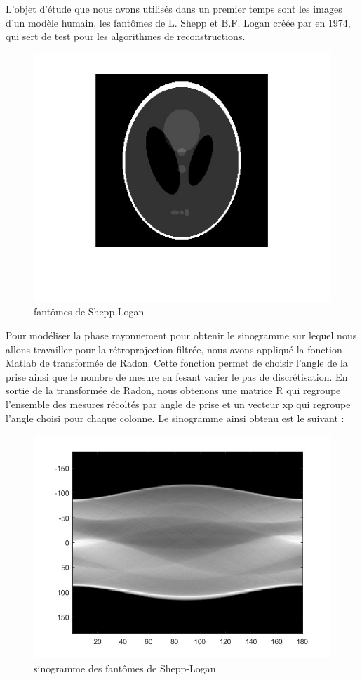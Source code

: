 \documentclass[conference]{IEEEtran}
\begin{document}
L'objet d'étude que nous avons utilisés dans un premier temps sont les images d'un modèle humain, les fantômes de L. Shepp et B.F. Logan créée par  en 1974, qui sert de test pour les algorithmes de reconstructions.

\begin{figure}[H]
\centering
\includegraphics[scale=0.7]{Shepp-logan}
\caption[fantômes de Shepp-Logan]{fantômes de Shepp-Logan}
\label{fig:gallery}
\end{figure}

Pour modéliser la phase rayonnement pour obtenir le sinogramme sur lequel nous allons travailler pour la rétroprojection filtrée, nous avons appliqué la fonction Matlab de transformée de Radon. Cette fonction permet de choisir l'angle  de la prise ainsi que le nombre de mesure en fesant varier le pas de discrétisation.
En sortie de la transformée de Radon, nous obtenons une matrice R qui regroupe l'ensemble des mesures récoltés par angle de prise et un vecteur xp qui regroupe l'angle choisi pour chaque colonne. Le sinogramme ainsi obtenu est le suivant :

\begin{figure}[H]
\centering
\includegraphics[scale=0.4]{sinogramme}
\caption[sinogramme des fantômes de Shepp-Logan]{sinogramme des fantômes de Shepp-Logan}
\label{fig:gallery}
\end{figure}
\end{document}

